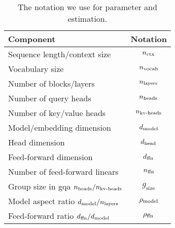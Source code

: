 \begin{table}[h]
        \vspace{-0.1cm}
	\caption{The notation we use for parameter and \flops estimation.}
	\label{tab:param-flop-notation}
	\centering
	\small
	\begin{tabular}{lc}
		\toprule
		Component                                   & Notation          \\
		\midrule
		Sequence length/context size                & $n_\text{ctx}$           \\
		Vocabulary size                             & $n_\text{vocab}$         \\
		Number of blocks/layers                     & $n_\text{layers}$        \\
		Number of query heads                       & $n_\text{heads}$         \\
		Number of key/value heads                   & $n_\text{kv-heads}$       \\
		Model/embedding dimension                   & $d_\text{model}$         \\
		Head dimension                              & $d_\text{head}$          \\
		Feed-forward dimension                      & $d_\text{ffn}$           \\
		Number of feed-forward linears              & $n_\text{ffn}$           \\
		Group size in \gls{gqa} $n_\text{heads}/n_\text{kv-heads}$ & $g_{\text{size}}$ \\
		Model aspect ratio $d_\text{model}/n_\text{layers}$       & $\rho_{\text{model}}$         \\
		Feed-forward ratio $d_\text{ffn}/d_\text{model}$          & $\rho_{\text{ffn}}$           \\
		\bottomrule
	\end{tabular}
        \vspace{-0.15cm}
\end{table}
